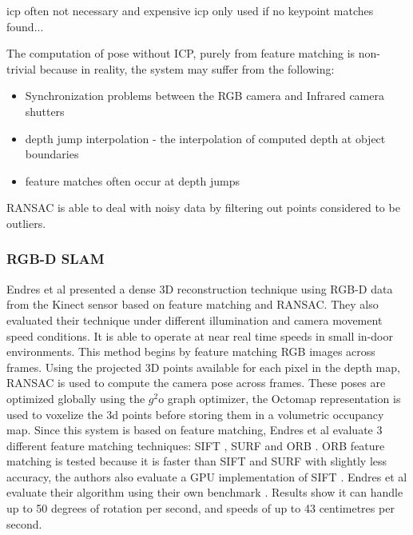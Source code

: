 icp often not necessary and expensive
icp only used if no keypoint matches found... \cite{Endres12Evaluation}

The computation of pose without ICP, purely from feature matching is non-trivial because in reality, the system may suffer from the following:

\begin{itemize}
\item Synchronization problems between the RGB camera and Infrared camera shutters
\item depth jump interpolation - the interpolation of computed depth at object boundaries
\item feature matches often occur at depth jumps
\end{itemize}

RANSAC \cite{Fischler81Random} is able to deal with noisy data by filtering out points considered to be outliers.


\subsubsection{RGB-D SLAM}

Endres et al \cite{Endres12Evaluation} presented a dense 3D reconstruction technique using RGB-D data from the Kinect sensor based on feature matching and RANSAC. They also evaluated their technique under different illumination and camera movement speed conditions. It is able to operate at near real time speeds in small in-door environments. This method begins by feature matching RGB images across frames. Using the projected 3D points available for each pixel in the depth map, RANSAC \cite{Fischler81Random} is used to compute the camera pose across frames. These poses are optimized globally using the $g^2$o graph optimizer, the Octomap representation \cite{Wurm10Octomap} is used to voxelize the 3d points before storing them in a volumetric occupancy map. Since this system is based on feature matching, Endres et al evaluate 3 different feature matching techniques: SIFT \cite{Lowe04Distinctive} , SURF \cite{Bay06Surf,Bay08Speeded} and ORB \cite{Rublee11Orb}. ORB feature matching is tested because it is faster than SIFT and SURF with slightly less accuracy, the authors also evaluate a GPU implementation of SIFT \cite{Wu07Siftgpu}. Endres et al evaluate their algorithm using their own benchmark \cite{Sturm11Towards}. Results show it can handle up to 50 degrees of rotation per second, and speeds of up to 43 centimetres per second.  \\


